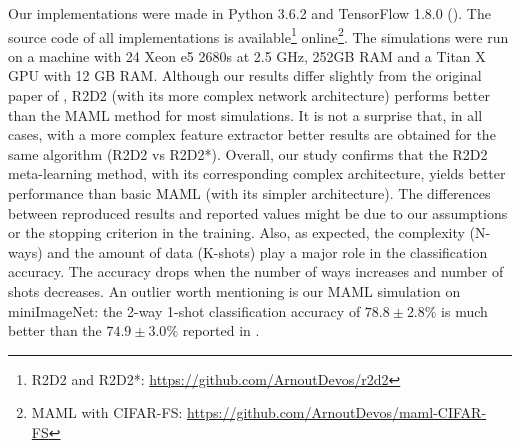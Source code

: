 Our implementations were made in Python 3.6.2 and TensorFlow 1.8.0 (\citet{tensorflow}). The source code of all implementations is available\footnote{R2D2 and R2D2*: \url{https://github.com/ArnoutDevos/r2d2}} online\footnote{MAML with CIFAR-FS: \url{https://github.com/ArnoutDevos/maml-CIFAR-FS}}. The simulations were run on a machine with 24 Xeon e5 2680s at 2.5 GHz, 252GB RAM and a Titan X GPU with 12 GB RAM.
%
Although our results differ slightly from the original paper of \citet{R2D2}, R2D2 (with its more complex network architecture) performs better than the MAML method for most simulations. It is not a surprise that, in all cases, with a more complex feature extractor better results are obtained for the same algorithm (R2D2 vs R2D2*). Overall, our study confirms that the R2D2 meta-learning method, with its corresponding complex architecture, yields better performance than basic MAML (with its simpler architecture). The differences between reproduced results and reported values might be due to our assumptions or the stopping criterion in the training. Also, as expected, the complexity (N-ways) and the amount of data (K-shots) play a major role in the classification accuracy. The accuracy drops when the number of ways increases and number of shots decreases. An outlier worth mentioning is our MAML simulation on miniImageNet: the 2-way 1-shot classification accuracy of $78.8 \pm 2.8\%$ is much better than the $74.9 \pm 3.0\%$ reported in \citet{finn}.\\

